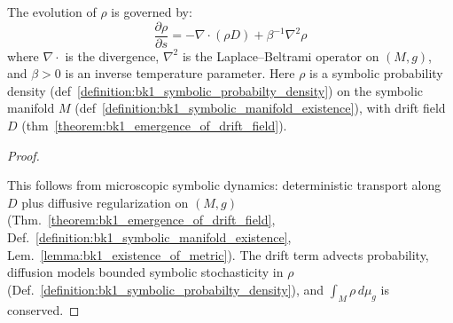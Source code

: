 \begin{theorem}
\label{theorem:bk1_fundamental_relation_fokker_plank_equation}
The evolution of $\rho$ is governed by:
\[
\frac{\partial \rho}{\partial s} = -\nabla \cdot (\rho D) + \beta^{-1} \nabla^2 \rho
\]
where $\nabla \cdot$ is the divergence, $\nabla^2$ is the Laplace–Beltrami operator on $(M,g)$, and $\beta > 0$ is an inverse temperature parameter. Here $\rho$ is a symbolic probability density (def~\ref{definition:bk1_symbolic_probabilty_density}) on the symbolic manifold $M$ (def~\ref{definition:bk1_symbolic_manifold_existence}), with drift field $D$ (thm~\ref{theorem:bk1_emergence_of_drift_field}).

\begin{proof}
\label{proof:bk1_sketch_fokker_planck_microdynamics}
\leavevmode

This follows from microscopic symbolic dynamics: deterministic transport along
$D$ plus diffusive regularization on $(M,g)$
(Thm.~\ref{theorem:bk1_emergence_of_drift_field},
Def.~\ref{definition:bk1_symbolic_manifold_existence},
Lem.~\ref{lemma:bk1_existence_of_metric}).
The drift term advects probability, diffusion models bounded symbolic
stochasticity in $\rho$
(Def.~\ref{definition:bk1_symbolic_probabilty_density}), and
$\int_M \rho \, d\mu_g$ is conserved.
\end{proof}
\end{theorem}

